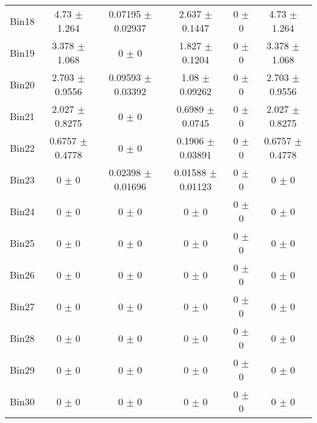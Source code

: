 \begin{tabular}{@{\extracolsep{4pt}}lccccc@{}}
     Bin18 & 4.73 $\pm$ 1.264 & 0.07195 $\pm$ 0.02937 & 2.637 $\pm$ 0.1447 & 0 $\pm$ 0 & 4.73 $\pm$ 1.264 \\ 
     Bin19 & 3.378 $\pm$ 1.068 & 0 $\pm$ 0 & 1.827 $\pm$ 0.1204 & 0 $\pm$ 0 & 3.378 $\pm$ 1.068 \\ 
     Bin20 & 2.703 $\pm$ 0.9556 & 0.09593 $\pm$ 0.03392 & 1.08 $\pm$ 0.09262 & 0 $\pm$ 0 & 2.703 $\pm$ 0.9556 \\ 
     Bin21 & 2.027 $\pm$ 0.8275 & 0 $\pm$ 0 & 0.6989 $\pm$ 0.0745 & 0 $\pm$ 0 & 2.027 $\pm$ 0.8275 \\ 
     Bin22 & 0.6757 $\pm$ 0.4778 & 0 $\pm$ 0 & 0.1906 $\pm$ 0.03891 & 0 $\pm$ 0 & 0.6757 $\pm$ 0.4778 \\ 
     Bin23 & 0 $\pm$ 0 & 0.02398 $\pm$ 0.01696 & 0.01588 $\pm$ 0.01123 & 0 $\pm$ 0 & 0 $\pm$ 0 \\ 
     Bin24 & 0 $\pm$ 0 & 0 $\pm$ 0 & 0 $\pm$ 0 & 0 $\pm$ 0 & 0 $\pm$ 0 \\ 
     Bin25 & 0 $\pm$ 0 & 0 $\pm$ 0 & 0 $\pm$ 0 & 0 $\pm$ 0 & 0 $\pm$ 0 \\ 
     Bin26 & 0 $\pm$ 0 & 0 $\pm$ 0 & 0 $\pm$ 0 & 0 $\pm$ 0 & 0 $\pm$ 0 \\ 
     Bin27 & 0 $\pm$ 0 & 0 $\pm$ 0 & 0 $\pm$ 0 & 0 $\pm$ 0 & 0 $\pm$ 0 \\ 
     Bin28 & 0 $\pm$ 0 & 0 $\pm$ 0 & 0 $\pm$ 0 & 0 $\pm$ 0 & 0 $\pm$ 0 \\ 
     Bin29 & 0 $\pm$ 0 & 0 $\pm$ 0 & 0 $\pm$ 0 & 0 $\pm$ 0 & 0 $\pm$ 0 \\ 
     Bin30 & 0 $\pm$ 0 & 0 $\pm$ 0 & 0 $\pm$ 0 & 0 $\pm$ 0 & 0 $\pm$ 0 \\ 
\hline\hline
  \end{tabular}
